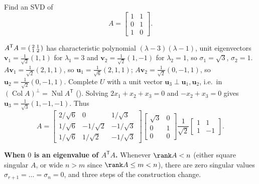 \documentclass[10pt]{scrartcl}
\newcommand{\vv}[1]{\mathbf{#1}}
\DeclareMathOperator{\Nul}{Nul}
\DeclareMathOperator{\Col}{Col}
\begin{document}
\begin{example*}
  Find an SVD of
  \[
    A=\begin{bmatrix}1&1\\0&1\\1&0\end{bmatrix}.
  \]
  \begin{steps}
    \ii $A^{\mathsf T}A=\begin{psmallmatrix}2&1\\1&2\end{psmallmatrix}$ has characteristic polynomial $(\lambda-3)(\lambda-1)$, unit eigenvectors $\vv v_1=\frac{1}{\sqrt{2}}(1,1)$ for $\lambda_1=3$ and $\vv v_2=\frac{1}{\sqrt{2}}(1,-1)$ for $\lambda_2=1$, so $\sigma_1=\sqrt{3}$, $\sigma_2=1$.
    \ii $A\vv v_1=\frac{1}{\sqrt{2}}(2,1,1)$, so $\vv u_1=\frac{1}{\sqrt{6}}(2,1,1)$; $A\vv v_2=\frac{1}{\sqrt{2}}(0,-1,1)$, so $\vv u_2=\frac{1}{\sqrt{2}}(0,-1,1)$.
    \ii Complete $U$ with a unit vector $\vv u_3\perp\vv u_1,\vv u_2$, i.e.\ in $(\Col A)^\perp=\Nul A^{\mathsf T}$ (). Solving $2x_1+x_2+x_3=0$ and $-x_2+x_3=0$ gives $\vv u_3=\frac{1}{\sqrt{3}}(1,-1,-1)$. Thus
    \[
      A = \begin{bmatrix}2/\sqrt{6}&0&1/\sqrt{3}\\1/\sqrt{6}&-1/\sqrt{2}&-1/\sqrt{3}\\1/\sqrt{6}&1/\sqrt{2}&-1/\sqrt{3}\end{bmatrix}
          \begin{bmatrix}\sqrt{3}&0\\0&1\\0&0\end{bmatrix}
          \frac{1}{\sqrt{2}}\begin{bmatrix}1&1\\1&-1\end{bmatrix}.
    \]
  \end{steps}
\end{example*}

\noindent\textbf{When $0$ is an eigenvalue of $A^{\mathsf T}A$.} Whenever $\rank A<n$ (either square singular $A$, or wide $n>m$ since $\rank A\le m<n$), there are zero singular values $\sigma_{r+1}=\dots=\sigma_n=0$, and three steps of the construction change.
\end{document}
